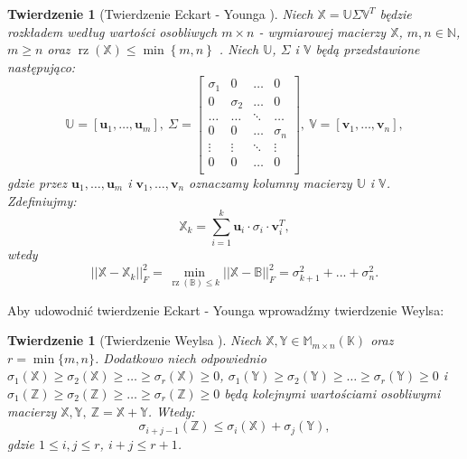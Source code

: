 \documentclass[12pt,a4paper]{report}
\newtheorem{tw}[df]{Twierdzenie}
\newcommand{\set}[1]{\left\lbrace {#1} \right\rbrace}
\newcommand{\setK}{\mathbb{K}}
\newcommand{\setN}{\mathbb{N}}
\newcommand{\rz}[1]{\operatorname{rz}\left({#1} \right)}
\begin{document}
\begin{tw}[Twierdzenie Eckart - Younga {\citep{ulafiir}}]%
Niech $\mathbb{X}=\mathbb{U}\Sigma \mathbb{V}^T$ będzie rozkładem według wartości osobliwych $m \times n$ - wymiarowej macierzy $\mathbb{X}$, $m,n \in \setN$, $m \geqslant n$ oraz $\rz{\mathbb{X}} \leqslant \min \set{m,n}$ . Niech $\mathbb{U}$, $\Sigma$ i $\mathbb{V}$ będą przedstawione następująco:
$$
\mathbb{U} = [\mathbf{u}_1, \ldots, \mathbf{u}_m], \: \Sigma = \left[
        \begin{array}{cccc}
         \sigma_{1} & 0 & \ldots & 0 \\
         0 & \sigma_{2} & \ldots & 0 \\
         \ldots & \ldots& \ddots & \ldots \\
         0 & 0 & \ldots & \sigma_{n} \\
         \vdots & \vdots & \ddots & \vdots \\
         0 & 0 & \ldots & 0 \\
         \end{array}
      \right], \: \mathbb{V} = [\mathbf{v}_1, \ldots, \mathbf{v}_n],
$$
gdzie przez $\mathbf{u}_1, \ldots, \mathbf{u}_m$ i $\mathbf{v}_1, \ldots, \mathbf{v}_n$ oznaczamy kolumny macierzy $\mathbb{U}$ i $\mathbb{V}$. Zdefiniujmy:
$$
\mathbb{X}_k = \sum_{i=1}^k \mathbf{u}_i\cdot \sigma_{i} \cdot \mathbf{v}_i^T,
$$
wtedy
$$
||\mathbb{X} - \mathbb{X}_k||_F^2 = \min \limits_{\rz{\mathbb{B}} \leqslant k } ||\mathbb{X} - \mathbb{B}||_F^2 = \sigma_{k+1}^2 + ... + \sigma_{n}^2.
$$
\end{tw}

Aby udowodnić twierdzenie Eckart - Younga wprowadźmy twierdzenie Weylsa:

\begin{tw}[Twierdzenie Weylsa {\citep[Tw. 4.17]{tsvdalra}}]
Niech $\mathbb{X}, \mathbb{Y} \in \mathbb{M}_{m \times n}(\setK)$ oraz $r=\min\{m,n\}$.
Dodatkowo niech odpowiednio $\sigma_1(\mathbb{X}) \geq \sigma_2(\mathbb{X})\geq \ldots \geq \sigma_r(\mathbb{X})\geq 0$, $\sigma_1(\mathbb{Y}) \geq \sigma_2(\mathbb{Y})\geq \ldots \geq \sigma_r(\mathbb{Y})\geq 0$ i $\sigma_1(\mathbb{Z}) \geq \sigma_2(\mathbb{Z})\geq \ldots \geq \sigma_r(\mathbb{Z})\geq 0$ będą kolejnymi wartościami osobliwymi macierzy $\mathbb{X}, \mathbb{Y}, \: \mathbb{Z}=\mathbb{X} + \mathbb{Y}$. Wtedy:
$$
\sigma_{i+j-1}(\mathbb{Z}) \leq \sigma_i(\mathbb{X}) + \sigma_j(\mathbb{Y}),
$$
gdzie $1 \leq i,j \leq r$, $i+j\leq r+1$.
\end{tw}
\end{document}
